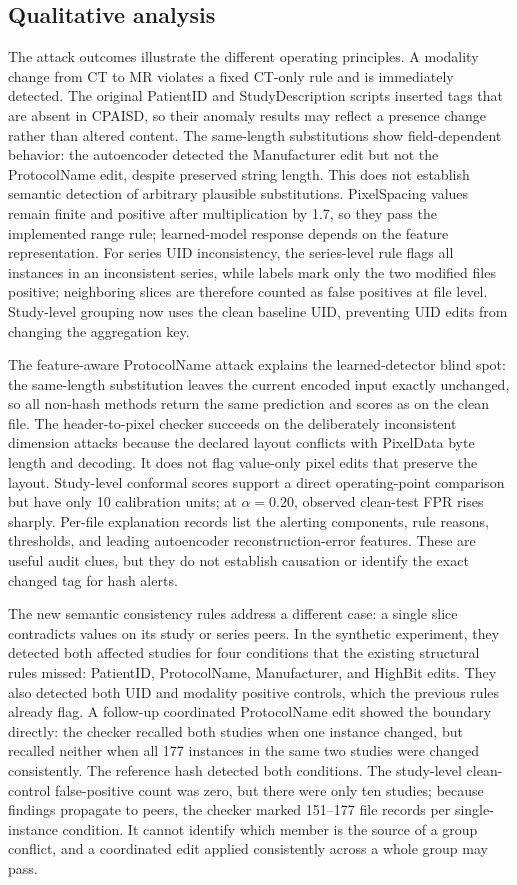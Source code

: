 \documentclass[journal]{IEEEtran}
\begin{document}
  \subsection{Qualitative analysis}
  The attack outcomes illustrate the different operating principles. A modality change from CT to MR violates a fixed CT-only rule and is immediately detected. The original PatientID and StudyDescription scripts inserted tags that are absent in CPAISD, so their anomaly results may reflect a presence change rather than altered content. The same-length substitutions show field-dependent behavior: the autoencoder detected the Manufacturer edit but not the ProtocolName edit, despite preserved string length. This does not establish semantic detection of arbitrary plausible substitutions. PixelSpacing values remain finite and positive after multiplication by 1.7, so they pass the implemented range rule; learned-model response depends on the feature representation. For series UID inconsistency, the series-level rule flags all instances in an inconsistent series, while labels mark only the two modified files positive; neighboring slices are therefore counted as false positives at file level. Study-level grouping now uses the clean baseline UID, preventing UID edits from changing the aggregation key.
  
  The feature-aware ProtocolName attack explains the learned-detector blind spot: the same-length substitution leaves the current encoded input exactly unchanged, so all non-hash methods return the same prediction and scores as on the clean file. The header-to-pixel checker succeeds on the deliberately inconsistent dimension attacks because the declared layout conflicts with PixelData byte length and decoding. It does not flag value-only pixel edits that preserve the layout. Study-level conformal scores support a direct operating-point comparison but have only 10 calibration units; at $\alpha=0.20$, observed clean-test FPR rises sharply. Per-file explanation records list the alerting components, rule reasons, thresholds, and leading autoencoder reconstruction-error features. These are useful audit clues, but they do not establish causation or identify the exact changed tag for hash alerts.
  
  The new semantic consistency rules address a different case: a single slice contradicts values on its study or series peers. In the synthetic experiment, they detected both affected studies for four conditions that the existing structural rules missed: PatientID, ProtocolName, Manufacturer, and HighBit edits. They also detected both UID and modality positive controls, which the previous rules already flag. A follow-up coordinated ProtocolName edit showed the boundary directly: the checker recalled both studies when one instance changed, but recalled neither when all 177 instances in the same two studies were changed consistently. The reference hash detected both conditions. The study-level clean-control false-positive count was zero, but there were only ten studies; because findings propagate to peers, the checker marked 151--177 file records per single-instance condition. It cannot identify which member is the source of a group conflict, and a coordinated edit applied consistently across a whole group may pass.
  
\end{document}
